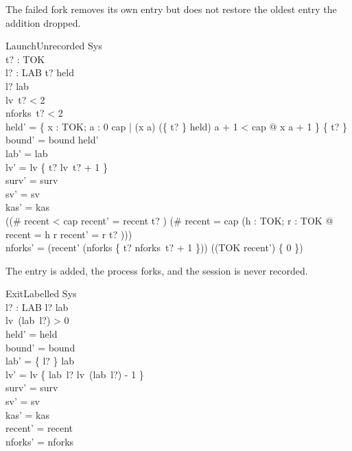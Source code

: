 \documentclass[a4paper,10pt,fleqn]{article}
\begin{document}
The failed fork removes its own entry but does not restore the oldest entry the addition dropped.

\begin{schema}{LaunchUnrecorded}
  \Delta Sys \\
  t? : TOK \\ l? : LAB
\where
  t? \notin \dom held \\
  l? \notin \dom lab \\
  lv~t? < 2 \\
  nforks~t? < 2 \\
  held' = \{ x : TOK; a : 0 \upto cap | (x \mapsto a) \in (\{ t? \} \ndres held) \land a + 1 < cap @ x \mapsto a + 1 \} \cup \{ t?  \} \\
  bound' = bound \cap \dom held' \\
  lab' = lab \\
  lv' = lv \oplus \{ t? \mapsto lv~t? + 1 \} \\
  surv' = surv \\
  sv' = sv \\
  kas' = kas \\
  ((\# recent < cap \land recent' = recent \cat \langle t? \rangle) \lor (\# recent = cap \land (\exists h : TOK; r : \seq TOK @ recent = \langle h \rangle \cat r \land recent' = r \cat \langle t? \rangle))) \\
  nforks' = (\ran recent' \dres (nforks \oplus \{ t? \mapsto nforks~t? + 1 \})) \cup ((TOK \setminus \ran recent') \cross \{ 0 \})
\end{schema}

The entry is added, the process forks, and the session is never recorded.

\begin{schema}{ExitLabelled}
  \Delta Sys \\
  l? : LAB
\where
  l? \in \dom lab \\
  lv~(lab~l?) > 0 \\
  held' = held \\
  bound' = bound \\
  lab' = \{ l? \} \ndres lab \\
  lv' = lv \oplus \{ lab~l? \mapsto lv~(lab~l?) - 1 \} \\
  surv' = surv \\
  sv' = sv \\
  kas' = kas \\
  recent' = recent \\
  nforks' = nforks
\end{schema}
\end{document}
